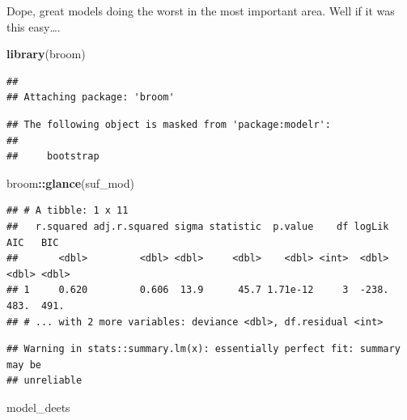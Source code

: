 \documentclass[
]{article}
\newenvironment{Shaded}{\begin{snugshade}}{\end{snugshade}}
\newcommand{\DataTypeTok}[1]{\textcolor[rgb]{0.13,0.29,0.53}{#1}}
\newcommand{\KeywordTok}[1]{\textcolor[rgb]{0.13,0.29,0.53}{\textbf{#1}}}
\newcommand{\NormalTok}[1]{#1}
\newcommand{\OperatorTok}[1]{\textcolor[rgb]{0.81,0.36,0.00}{\textbf{#1}}}
\newcommand{\StringTok}[1]{\textcolor[rgb]{0.31,0.60,0.02}{#1}}
\begin{document}
Dope, great models doing the worst in the most important area. Well if
it was this easy\ldots.

\begin{Shaded}
\begin{Highlighting}[]
\KeywordTok{library}\NormalTok{(broom)}
\end{Highlighting}
\end{Shaded}

\begin{verbatim}
## 
## Attaching package: 'broom'
\end{verbatim}

\begin{verbatim}
## The following object is masked from 'package:modelr':
## 
##     bootstrap
\end{verbatim}

\begin{Shaded}
\begin{Highlighting}[]
\NormalTok{broom}\OperatorTok{::}\KeywordTok{glance}\NormalTok{(suf_mod)}
\end{Highlighting}
\end{Shaded}

\begin{verbatim}
## # A tibble: 1 x 11
##   r.squared adj.r.squared sigma statistic  p.value    df logLik   AIC   BIC
##       <dbl>         <dbl> <dbl>     <dbl>    <dbl> <int>  <dbl> <dbl> <dbl>
## 1     0.620         0.606  13.9      45.7 1.71e-12     3  -238.  483.  491.
## # ... with 2 more variables: deviance <dbl>, df.residual <int>
\end{verbatim}

\begin{Shaded}
\end{Shaded}

\begin{verbatim}
## Warning in stats::summary.lm(x): essentially perfect fit: summary may be
## unreliable
\end{verbatim}

\begin{Shaded}
\begin{Highlighting}[]
\NormalTok{model_deets}
\end{Highlighting}
\end{Shaded}
\end{document}
